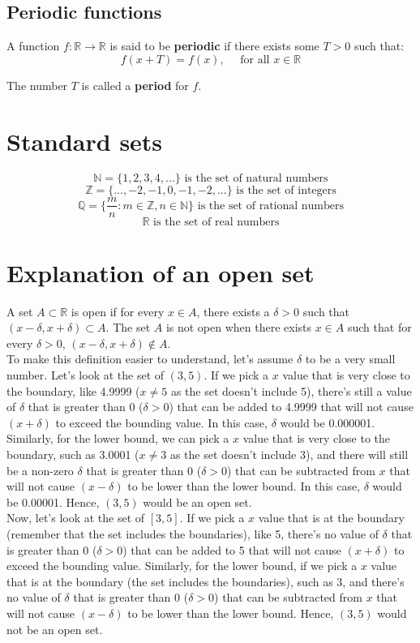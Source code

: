 \documentclass[11pt]{article}
\begin{document}
\subsection{Periodic functions}
\label{sec:org42046c5}
A function \(f: \mathbb{R} \rightarrow \mathbb{R}\) is said to be \textbf{periodic} if there exists some \(T > 0\) such that:
\[f(x + T) = f(x), \quad \text{ for all } x \in \mathbb{R}\]

The number \(T\) is called a \textbf{period} for \(f\).


\section{Standard sets}
\label{sec:org2b9f610}
\[\mathbb{N} = \{1, 2, 3, 4, ...\} \text{ is the set of natural numbers}\]
\[\mathbb{Z} = \{..., -2, -1, 0, -1, -2, ...\} \text{ is the set of integers}\]
\[\mathbb{Q} = \{\frac{m}{n} : m \in \mathbb{Z}, n \in \mathbb{N}\} \text{ is the set of rational numbers}\]
\[\mathbb{R} \text{ is the set of real numbers}\]

\newpage

\section{Explanation of an open set}
\label{sec:org8864a74}
A set \(A \subset \mathbb{R}\) is open if for every \(x \in A\), there exists a \(\delta > 0\) such that \((x - \delta, x + \delta) \subset A\). The set \(A\) is not open when there exists \(x \in A\) such that for every \(\delta > 0\), \((x - \delta, x + \delta) \notin A\).
\\[0pt]

To make this definition easier to understand, let's assume \(\delta\) to be a very small number. Let's look at the set of \((3,5)\). If we pick a \(x\) value that is very close to the boundary, like 4.9999 (\(x \neq 5\) as the set doesn't include 5), there's still a value of \(\delta\) that is greater than 0 (\(\delta > 0\)) that can be added to 4.9999 that will not cause \((x + \delta)\) to exceed the bounding value. In this case, \(\delta\) would be 0.000001. Similarly, for the lower bound, we can pick a \(x\) value that is very close to the boundary, such as 3.0001 (\(x \neq 3\) as the set doesn't include 3), and there will still be a non-zero \(\delta\) that is greater than 0 (\(\delta > 0\)) that can be subtracted from \(x\) that will not cause \((x - \delta)\) to be lower than the lower bound. In this case, \(\delta\) would be 0.00001. Hence, \((3,5)\) would be an open set.
\\[0pt]

Now, let's look at the set of \([3,5]\). If we pick a \(x\) value that is at the boundary (remember that the set includes the boundaries), like 5, there's no value of \(\delta\) that is greater than 0 (\(\delta > 0\)) that can be added to 5 that will not cause \((x + \delta)\) to exceed the bounding value. Similarly, for the lower bound, if we pick a \(x\) value that is at the boundary (the set includes the boundaries), such as 3, and there's no value of \(\delta\) that is greater than 0 (\(\delta > 0\)) that can be subtracted from \(x\) that will not cause \((x - \delta)\) to be lower than the lower bound. Hence, \((3,5)\) would not be an open set.
\end{document}
